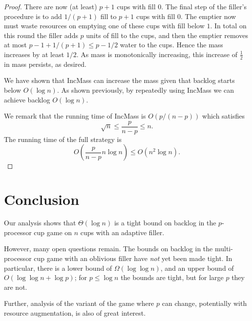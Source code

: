\documentclass[11pt]{article}
\begin{document}
\begin{proof}
There are now (at least) $p+1$ cups with fill $0$. The final step
of the filler's procedure is to add $1/(p+1)$ fill to $p+1$ cups with
fill $0$. 
The emptier now must waste resources on emptying one of these
cups with fill below $1$. In total on this round the filler adds
$p$ units of fill to the cups, and then the emptier removes at
most $p-1 + 1/(p+1) \le p-1/2$ water to the cups. Hence the mass
increases by at least $1/2$. As mass is monotonically increasing,
this increase of $\frac{1}{2}$ in mass persists, as desired.

We have shown that IncMass can increase the mass given that
backlog starts below $O(\log n)$. As shown previously, by
repeatedly using IncMass we can achieve backlog $O(\log n)$.

We remark that the running time of IncMass is $O(p/(n-p))$ 
which satisfies
$$\sqrt{n} \le \frac{p}{n-p} \le n.$$
The running time of the full strategy is 
$$O\left(\frac{p}{n-p} n\log n\right) \le O(n^2 \log n).$$
\end{proof}

\section{Conclusion}
Our analysis shows that $\Theta(\log n)$ is a tight bound on
backlog in the $p$-processor cup game on $n$ cups with an
adaptive filler.

However, many open questions remain. The bounds on backlog in the
multi-processor cup game with an oblivious filler have \emph{not}
yet been made tight. In particular, there is a lower bound of
$\Omega(\log \log n)$, and an upper bound of $O(\log \log n +
\log p)$; for $p \le \log n$ the bounds are tight, but for large
$p$ they are not.

Further, analysis of the variant of the game where $p$ can
change, potentially with resource augmentation, is also of great
interest.
\end{document}

